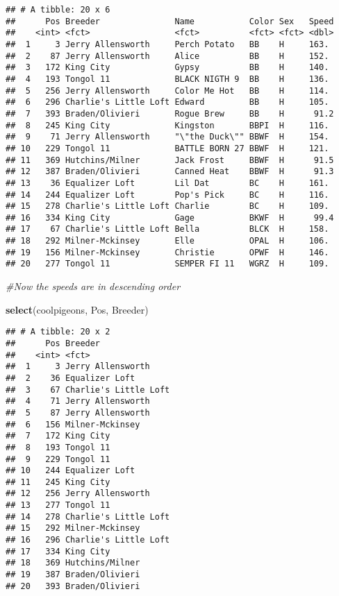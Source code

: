 \documentclass[]{article}
\newenvironment{Shaded}{\begin{snugshade}}{\end{snugshade}}
\newcommand{\KeywordTok}[1]{\textcolor[rgb]{0.13,0.29,0.53}{\textbf{#1}}}
\newcommand{\CommentTok}[1]{\textcolor[rgb]{0.56,0.35,0.01}{\textit{#1}}}
\newcommand{\NormalTok}[1]{#1}
\begin{document}
\begin{verbatim}
## # A tibble: 20 x 6
##      Pos Breeder               Name           Color Sex   Speed
##    <int> <fct>                 <fct>          <fct> <fct> <dbl>
##  1     3 Jerry Allensworth     Perch Potato   BB    H     163. 
##  2    87 Jerry Allensworth     Alice          BB    H     152. 
##  3   172 King City             Gypsy          BB    H     140. 
##  4   193 Tongol 11             BLACK NIGTH 9  BB    H     136. 
##  5   256 Jerry Allensworth     Color Me Hot   BB    H     114. 
##  6   296 Charlie's Little Loft Edward         BB    H     105. 
##  7   393 Braden/Olivieri       Rogue Brew     BB    H      91.2
##  8   245 King City             Kingston       BBPI  H     116. 
##  9    71 Jerry Allensworth     "\"the Duck\"" BBWF  H     154. 
## 10   229 Tongol 11             BATTLE BORN 27 BBWF  H     121. 
## 11   369 Hutchins/Milner       Jack Frost     BBWF  H      91.5
## 12   387 Braden/Olivieri       Canned Heat    BBWF  H      91.3
## 13    36 Equalizer Loft        Lil Dat        BC    H     161. 
## 14   244 Equalizer Loft        Pop's Pick     BC    H     116. 
## 15   278 Charlie's Little Loft Charlie        BC    H     109. 
## 16   334 King City             Gage           BKWF  H      99.4
## 17    67 Charlie's Little Loft Bella          BLCK  H     158. 
## 18   292 Milner-Mckinsey       Elle           OPAL  H     106. 
## 19   156 Milner-Mckinsey       Christie       OPWF  H     146. 
## 20   277 Tongol 11             SEMPER FI 11   WGRZ  H     109.
\end{verbatim}

\begin{Shaded}
\begin{Highlighting}[]
\CommentTok{#Now the speeds are in descending order}
\end{Highlighting}
\end{Shaded}

\begin{Shaded}
\begin{Highlighting}[]
\KeywordTok{select}\NormalTok{(coolpigeons, Pos, Breeder)}
\end{Highlighting}
\end{Shaded}

\begin{verbatim}
## # A tibble: 20 x 2
##      Pos Breeder              
##    <int> <fct>                
##  1     3 Jerry Allensworth    
##  2    36 Equalizer Loft       
##  3    67 Charlie's Little Loft
##  4    71 Jerry Allensworth    
##  5    87 Jerry Allensworth    
##  6   156 Milner-Mckinsey      
##  7   172 King City            
##  8   193 Tongol 11            
##  9   229 Tongol 11            
## 10   244 Equalizer Loft       
## 11   245 King City            
## 12   256 Jerry Allensworth    
## 13   277 Tongol 11            
## 14   278 Charlie's Little Loft
## 15   292 Milner-Mckinsey      
## 16   296 Charlie's Little Loft
## 17   334 King City            
## 18   369 Hutchins/Milner      
## 19   387 Braden/Olivieri      
## 20   393 Braden/Olivieri
\end{verbatim}
\end{document}
